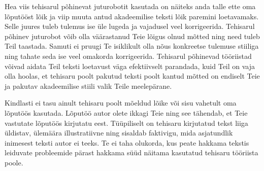 Hea viis tehisarul põhinevat juturobotit kasutada on näiteks anda talle ette oma lõputööst lõik ja viip muuta antud akadeemilise teksti lõik paremini loetavamaks. Selle juures tuleb tulemus ise üle lugeda ja vajadusel veel korrigeerida. Tehisarul põhinev juturobot võib olla väärastanud Teie lõigus olnud mõtted ning need tuleb Teil taastada. Samuti ei pruugi Te isiklikult olla nõus konkreetse tulemuse stiiliga ning tahate seda ise veel omakorda korrigeerida. Tehisarul põhinevad tööriistad võivad aidata Teil teksti loetavust väga efektiivselt parandada, kuid Teil on vaja olla hoolas, et tehisaru poolt pakutud teksti poolt kantud mõtted on endiselt Teie ja pakutav akadeemilise stiili valik Teile meelepärane.

Kindlasti ei tasu ainult tehisaru poolt mõeldud lõike või sisu vahetult oma lõputöös kasutada. Lõputöö autor olete ikkagi Teie ning see tähendab, et Teie vastutate lõputöös kirjutatu eest. Tüüpiliselt on tehisaru kirjutatud tekst liiga üldistav, ülemäära illustratiivne ning sisaldab faktivigu, mida asjatundlik inimesest teksti autor ei teeks. Te ei taha olukorda, kus peate hakkama tekstis leiduvate probleemide pärast hakkama süüd näitama kasutatud tehisaru tööriista poole.
